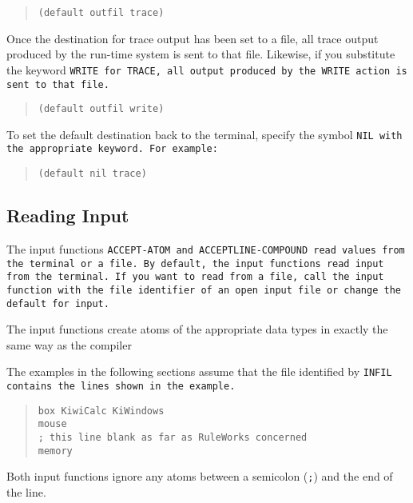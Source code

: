 \begin{quote}
\begin{verbatim}
(default outfil trace)
\end{verbatim}
\end{quote}

Once the destination for trace output has been set to a file, all
trace output produced by the run-time system is sent to that file.
Likewise, if you substitute the keyword \tt{WRITE} for \tt{TRACE}, all
output produced by the \tt{WRITE} action is sent to that file.

\begin{quote}
\begin{verbatim}
(default outfil write)
\end{verbatim}
\end{quote}

To set the default destination back to the terminal, specify the
symbol \tt{NIL} with the appropriate keyword. For example:

\begin{quote}
\begin{verbatim}
(default nil trace)
\end{verbatim}
\end{quote}

\subsection{Reading Input}

The input functions \tt{ACCEPT-ATOM} and \tt{ACCEPTLINE-COMPOUND} read
values from the terminal or a file. By default, the input functions
read input from the terminal. If you want to read from a file, call
the input function with the file identifier of an open input file or
change the default for input.

The input functions create atoms of the appropriate data types in
exactly the same way as the compiler

The examples in the following sections assume that the file identified
by \tt{INFIL} contains the lines shown in the example.

\begin{quote}
\begin{verbatim}
box KiwiCalc KiWindows
mouse
; this line blank as far as RuleWorks concerned
memory
\end{verbatim}
\end{quote}

Both input functions ignore any atoms between a semicolon (\verb|;|)
and the end of the line.

